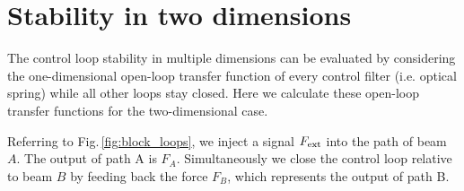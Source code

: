 \section{Stability in two dimensions}
\label{app:C}
The control loop stability in multiple dimensions can be evaluated by considering the one-dimensional open-loop transfer function of every control filter (i.e. optical spring) while all other loops stay closed. Here we calculate these open-loop transfer functions for the two-dimensional case.

Referring to Fig.\,\ref{fig:block_loops}, we inject a signal %
$F_{\rm ext}$ into the path of beam $A$. The output of path A is $F_A$. %
Simultaneously we close the control loop relative to beam $B$
by feeding back the force $F_B$, which represents the output of path B.

